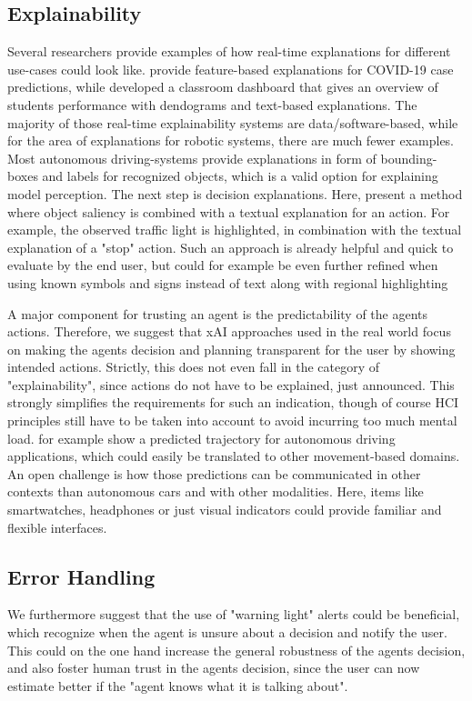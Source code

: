 \documentclass[twoside,11pt]{article}
\begin{document}
\subsection{Explainability}

Several researchers provide examples of how real-time explanations for different use-cases could look like. \citet{RodriguezEtAl:2021:DeepCovidxAI} provide feature-based explanations for COVID-19 case predictions, while \citet{Kulkarni:2021:EducationAIDashboard} developed a classroom dashboard that gives an overview of students performance with dendograms and text-based explanations. The majority of those real-time explainability systems are data/software-based, while for the area of explanations for robotic systems, there are much fewer examples.
Most autonomous driving-systems provide explanations in form of bounding-boxes and labels for recognized objects, which is a valid option for explaining model perception. 
The next step is decision explanations. Here, \citet{Ben-YounesEtAl:2022:DrivingBehaviorEx} present a method where object saliency is combined with a textual explanation for an action. For example, the observed traffic light is highlighted, in combination with the textual explanation of a "stop" action. Such an approach is already helpful and quick to evaluate by the end user, but could for example be even further refined when using known symbols and signs instead of text along with regional highlighting 

A major component for trusting an agent is the predictability of the agents actions. Therefore, we suggest that xAI approaches used in the real world focus on making the agents decision and planning transparent for the user by showing intended actions. Strictly, this does not even fall in the category of "explainability", since actions do not have to be explained, just announced. This strongly simplifies the requirements for such an indication, though of course HCI principles still have to be taken into account to avoid incurring too much mental load. \citet{Caltagarione:2017:DrivingPathGeneration} for example show a predicted trajectory for autonomous driving applications, which could easily be translated to other movement-based domains. 
An open challenge is how those predictions can be communicated in other contexts than autonomous cars and with other modalities. Here, items like smartwatches, headphones or just visual indicators could provide familiar and flexible interfaces.

\subsection{Error Handling}
We furthermore suggest that the use of "warning light" alerts could be beneficial, which recognize when the agent is unsure about a decision and notify the user. This could on the one hand increase the general robustness of the agents decision, and also foster human trust in the agents decision, since the user can now estimate better if the "agent knows what it is talking about".
\end{document}

